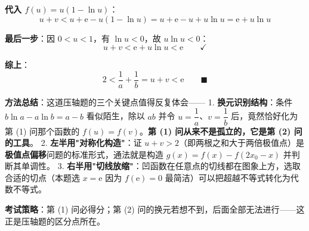 \begin{answer}
\textbf{代入 $f(u)=u(1-\ln u)$}：
\nopagebreak[4]
\[u+v<u+\mathrm e-u(1-\ln u)=u+\mathrm e-u+u\ln u=\mathrm e+u\ln u\]

\textbf{最后一步}：因 $0<u<1$，有 $\ln u<0$，故 $u\ln u<0$：
\nopagebreak[4]
\[u+v<\mathrm e+u\ln u<\mathrm e\qquad\checkmark\]

\par\medskip

\textbf{综上}：
\nopagebreak[4]
\[2<\frac1a+\frac1b=u+v<\mathrm e\qquad\blacksquare\]

\begin{gktip}
\textbf{方法总结}：这道压轴题的三个关键点值得反复体会——
1. \textbf{换元识别结构}：条件 $b\ln a-a\ln b=a-b$ 看似陌生，除以 $ab$ 并令 $u=\dfrac1a$、$v=\dfrac1b$ 后，竟然恰好化为第 (1) 问那个函数的 $f(u)=f(v)$。\textbf{第 (1) 问从来不是孤立的，它是第 (2) 问的工具}。
2. \textbf{左半用"对称化构造"}：证 $u+v>2$（即两根之和大于两倍极值点）是\textbf{极值点偏移}问题的标准形式，通法就是构造 $g(x)=f(x)-f(2x_0-x)$ 并判断其单调性。
3. \textbf{右半用"切线放缩"}：凹函数在任意点的切线都在图象上方，选取合适的切点（本题选 $x=\mathrm e$ 因为 $f(\mathrm e)=0$ 最简洁）可以把超越不等式转化为代数不等式。

\textbf{考试策略}：第 (1) 问必得分；第 (2) 问的换元若想不到，后面全部无法进行——这正是压轴题的区分点所在。
\end{gktip}



\end{answer}